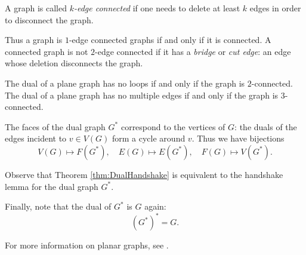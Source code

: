 \begin{page}
\setcounter{section}{3}
\setcounter{subsection}{4}
\setcounter{dfn}{12}
\label{portion:360}

\begin{dfn}
A graph is called \emph{$k$-edge connected} if one needs to delete at least $k$ edges in order to disconnect the graph.
\end{dfn}

\end{page}

\begin{page}
\setcounter{section}{3}
\setcounter{subsection}{4}
\setcounter{dfn}{12}
\label{portion:361}

Thus a graph is $1$-edge connected graphs if and only if it is connected.
A connected graph is not $2$-edge connected if it has a \emph{bridge} or \emph{cut edge}: an edge whose deletion disconnects the graph.


\end{page}

\begin{page}
\setcounter{section}{3}
\setcounter{subsection}{4}
\setcounter{dfn}{13}
\label{portion:363}

\begin{lem}
The dual of a plane graph has no loops if and only if the graph is $2$-connected.
The dual of a plane graph has no multiple edges if and only if the graph is $3$-connected.
\end{lem}

\end{page}

\begin{page}
\setcounter{section}{4}
\setcounter{subsection}{0}
\setcounter{dfn}{13}
\label{portion:364}


The faces of the dual graph $G^*$ correspond to the vertices of $G$:
the duals of the edges incident to $v \in V(G)$ form a cycle around $v$.
Thus we have bijections
\[
V(G) \mapsto F(G^*), \quad E(G) \mapsto E(G^*), \quad F(G) \mapsto V(G^*).
\]

Observe that Theorem \ref{thm:DualHandshake} is equivalent to the handshake lemma for the dual graph $G^*$.

Finally, note that the dual of $G^*$ is $G$ again:
\[
(G^*)^* = G.
\]

\bigskip

For more information on planar graphs, see \cite[Chapter 10]{BM}.





\end{page}

